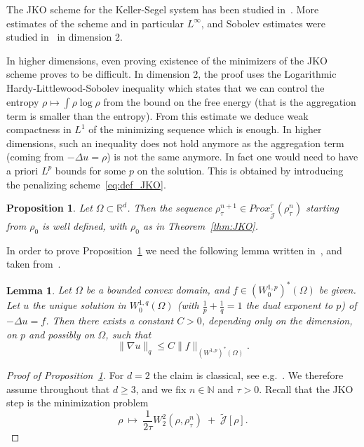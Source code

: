 \documentclass[a4paper,twosided, 11pt]{article}
\renewcommand{\color}[2][]{}
\newcommand{\R}{\mathbb{R}}
\newcommand {\f}   {\frac}
\theoremstyle{plain}
\newtheorem{lemma}[thm]{Lemma}
\newtheorem{proposition}[thm]{Proposition}
\theoremstyle{remark}
\numberwithin{equation}{section}
\begin{document}
The JKO scheme for the Keller-Segel system has been studied in~\cite{blanchet-ks-gradient-2013,blanchet2013gradient,blanchet2008convergence}. More estimates of the scheme and in particular $L^{\infty}$, and Sobolev estimates were studied in~\cite{dimarino} in dimension 2. {\color{blue}In higher dimensions, even proving existence of the minimizers of the JKO scheme proves to be difficult. In dimension 2, the proof uses the Logarithmic Hardy-Littlewood-Sobolev inequality which states that we can control the entropy $\rho\mapsto\int\rho\log\rho$ from the bound on the free energy (that is the aggregation term is smaller than the entropy). From this estimate we deduce weak compactness in $L^1$ of the minimizing sequence which is enough. In higher dimensions, such an inequality does not hold anymore as the aggregation term (coming from $-\Delta u =\rho$) is not the same anymore. In fact one would need to have a priori $L^p$ bounds for some $p$ on the solution. This is obtained by introducing the penalizing scheme~\eqref{eq:def_JKO}. 

\begin{proposition}\label{prop:existence_JKO}
 Let $\Omega\subset\R^d$.   Then the sequence $\rho^{n+1}_{\tau}\in Prox_{\widetilde{\mathcal{J}}}^{\tau}(\rho^{n}_{\tau})$ starting from $\rho_0$ is well defined, with $\rho_{0}$ as in Theorem~\ref{thm:JKO}.   
\end{proposition}

In order to prove Proposition~\ref{prop:existence_JKO} we need the following lemma written in~\cite[Lemma 5.10]{dimarino}, and taken from~\cite[Theorem 10.15]{giusti2003direct}.
\begin{lemma}\label{lem:sobone2} Let $\Omega$ be a bounded convex domain, and $f \in{(W^{1,p}_0)^*(\Omega)}$ be given. Let $u$ the unique solution in $W^{1,q}_0(\Omega)$ (with $\f{1}{p} + \f{1}{q}=1$ the dual exponent to $p$) of $-\Delta u=f$. Then there exists a constant $C>0$, depending only on the dimension, on $p$ and possibly on $\Omega$, such that
$$  \| \nabla u \|_{q} \leq  C\| f \|_{(W^{1,p})^*(\Omega)} . $$
\end{lemma}


\begin{proof}[Proof of Proposition~\ref{prop:existence_JKO}]
For $d=2$ the claim is classical, see e.g.~\cite{dimarino}. We therefore assume throughout that
$d\ge 3$, and we fix $n\in\mathbb{N}$ and $\tau>0$.
Recall that the JKO step is the minimization problem
\[
\rho \ \longmapsto\ \frac1{2\tau}W_2^2(\rho,\rho_\tau^n)\;+\;\widetilde{\mathcal{J}}[\rho].
\]



\end{proof}}
\end{document}
